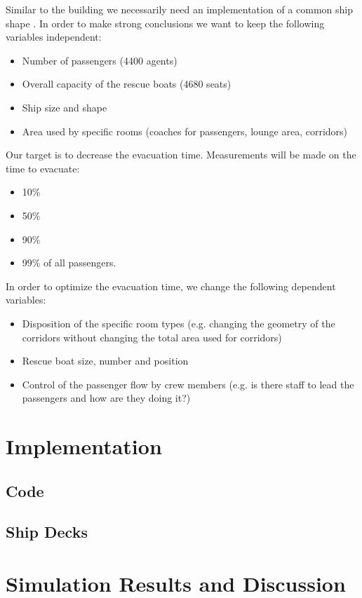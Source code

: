 \documentclass[11pt]{article}
\begin{document}
Similar to the building we necessarily need an  implementation of a common ship shape \cite{shipdecks}. In order to make strong conclusions we want to keep the following variables independent:
\begin{itemize}
\item Number of passengers (4400 agents)
\item Overall capacity of the rescue boats (4680 seats)
\item Ship size and shape
\item Area used by specific rooms (coaches for passengers, lounge area, corridors)
\end{itemize}
Our target is to decrease the evacuation time. Measurements will be made on the time to evacuate:
\begin{itemize}
\item 10\%
\item 50\%
\item 90\%
\item 99\% of all passengers.
\end{itemize}
In order to optimize the evacuation time, we change the following dependent variables:
\begin{itemize}
\item Disposition of the specific room types (e.g. changing the geometry of the corridors without changing the total area used for corridors)
\item Rescue boat size, number and position
\item Control of the passenger flow by crew members (e.g. is there staff to lead the passengers and how are they doing it?)
\end{itemize}




\section{Implementation}
\subsection{Code}
\subsection{Ship Decks}
\section{Simulation Results and Discussion}
\end{document}
